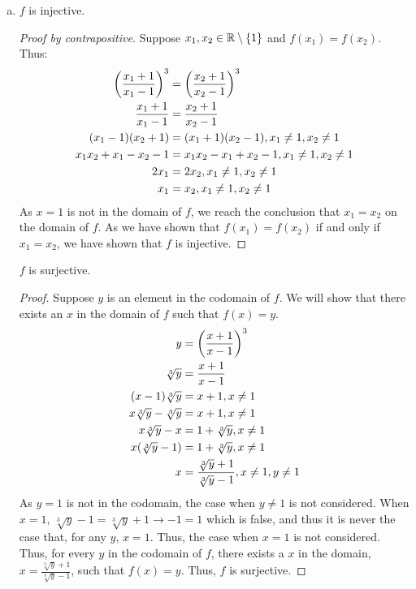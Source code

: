 \documentclass[11pt]{scrartcl}
\theoremstyle{dotlessP}
\theoremstyle{dotlessN}
\DeclarePairedDelimiter\paren{(}{)} %
\DeclarePairedDelimiter\set{\{}{\}}
\newcommand{\reals}{\mathbb{R}} %
\newcommand{\ints}{\mathbb{Z}}
\begin{document}
\begin{enumerate}[(a)]
\begin{proof}
			However, $\displaystyle\frac{1}{2} \not\in \ints$.  As we have shown that there exists a value in the codomain $y$ such that there does not exist a value in the domain $x$ such that $f(x) = y$, we have shown that $f$ is not surjective.
		\end{proof}
	\item 
		\begin{claim*}
			$f$ is injective.
		\end{claim*}
		\begin{proof}
			[Proof by contrapositive]
			Suppose $x_1, x_2 \in \reals \setminus \set*{1}$ and $f(x_1) = f(x_2)$. Thus:
			\begin{align*}
				\paren*{\frac{x_1 + 1}{x_1 -1}}^3 &= \paren*{\frac{x_2 + 1}{x_2 -1}}^3 \\
				\frac{x_1 + 1}{x_1 -1} &= \frac{x_2 + 1}{x_2 -1} \\
				(x_1 -1)(x_2 + 1) &= (x_1 + 1)(x_2 - 1), x_1 \neq 1, x_2 \neq 1 \\
				x_1x_2 +x_1 -x_2 - 1 &= x_1x_2 - x_1 + x_2 - 1, x_1 \neq 1, x_2 \neq 1 \\
				2x_1 &= 2x_2, x_1 \neq 1, x_2 \neq 1 \\
				x_1 &= x_2, x_1 \neq 1, x_2 \neq 1 
			\end{align*} 
			As $x = 1$ is not in the domain of $f$, we reach the conclusion that $x_1 = x_2$ on the domain of $f$. As we have shown that $f(x_1) = f(x_2)$ if and only if $x_1 = x_2$, we have shown that $f$ is injective. 
		\end{proof} 
			\begin{claim*}
			$f$ is surjective.
		\end{claim*}
		\begin{proof}
			Suppose $y$ is an element in the codomain of $f$. We will show that there exists an $x$ in the domain of $f$ such that $f(x) =y$.
			\begin{align*}
				y &= \paren*{\frac{x+1}{x-1}}^3 \\
				\sqrt[3]y &= \frac{x+1}{x-1} \\
				(x-1)\sqrt[3]y &= x+1, x \neq 1 \\
				x\sqrt[3]y - \sqrt[3]y &= x + 1, x \neq 1 \\
				x\sqrt[3]y - x &= 1 + \sqrt[3]y, x \neq 1 \\
				x(\sqrt[3]y - 1) &= 1 + \sqrt[3]y, x \neq 1 \\
				x &= \frac{\sqrt[3]y + 1}{\sqrt[3]y - 1}, x \neq 1, y \neq 1
			\end{align*}
			As $y=1$ is not in the codomain, the case when $y \neq 1$ is not considered. When $x = 1$, $\sqrt[3]y - 1 = \sqrt[3]y + 1 \to -1 = 1$ which is false, and thus it is never the case that, for any $y$, $x = 1$. Thus, the case when $x=1$ is not considered. Thus, for every $y$ in the codomain of $ f$, there exists a $x$ in the domain, $x = \displaystyle\frac{\sqrt[3]y + 1}{\sqrt[3]y - 1}$, such that $f(x) = y$. Thus,  $f$ is surjective.

\end{proof}
\end{enumerate}
\end{document}
